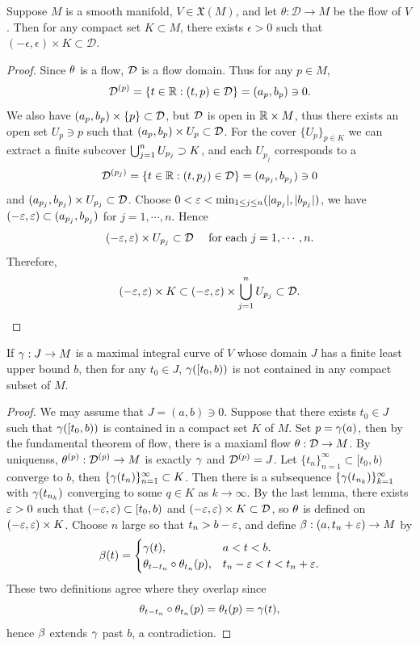 \begin{lemma}
    Suppose $M$ is a smooth manifold, $V \in \mathfrak{X}(M)$, and let $\theta: \mathcal{D} \rightarrow M$ be the flow of $V$. Then for any compact set $K \subset M$, there exists $\epsilon>0$ such that $(-\epsilon, \epsilon) \times K \subset \mathcal{D}$. 
\end{lemma}
\begin{proof}
    Since $\theta$ is a flow, $\mathcal{D}$ is a flow domain. Thus for any $p \in M$, $$\mathcal{D}^{(p)} = \{t \in \mathbb{R}: (t,p) \in \mathcal{D}\} = (a_p, b_p) \ni 0.$$
    We also have $(a_p, b_p) \times \{p\} \subset \mathcal{D}$, but $\mathcal{D}$ is open in $\mathbb{R} \times M$, thus there exists an open set $U_p \ni p$ such that $(a_p, b_p) \times U_p \subset \mathcal{D}$. For the cover $\{U_p\}_{p \in K}$ we can extract a finite subcover $\bigcup_{j=1}^{n}U_{p_j} \supset K$, and each $U_{p_j}$ corresponds to a 
    $$\mathcal{D}^{(p_j)} = \{t \in \mathbb{R}: (t,p_j) \in \mathcal{D} \} = (a_{p_j}, b_{p_j}) \ni 0 $$ and 
    $(a_{p_j}, b_{p_j}) \times U_{p_j} \subset \mathcal{D}$. Choose $0 < \varepsilon < \min_{1\leq j \leq n} (|a_{p_j}|, |b_{p_j}|)$, we have $(-\varepsilon, \varepsilon) \subset (a_{p_j}, b_{p_j})$ for $j=1, \cdots, n$. Hence 
    $$(-\varepsilon, \varepsilon) \times U_{p_j} \subset \mathcal{D} \quad \text{ for each } j=1, \cdots, n. $$
    Therefore, 
    $$(-\varepsilon, \varepsilon) \times K \subset (-\varepsilon, \varepsilon) \times \bigcup_{j=1}^{n}U_{p_j} \subset \mathcal{D}. $$
\end{proof}
\begin{lemma}\label{9.19}
    If $\gamma:J \to M$ is a maximal integral curve of $V$ whose domain $J$ has a finite least upper bound $b$, then for any $t_0 \in J$, $\gamma([t_0,b))$ is not contained in any compact subset of $M$. 
\end{lemma}
\begin{proof}
    We may assume that $J = (a,b) \ni 0$. Suppose that there exists $t_0 \in J$ such that $\gamma([t_0, b))$ is contained in a compact set $K$ of $M$. Set $p = \gamma(a)$, then by the fundamental theorem of flow, there is a maxiaml flow $\theta:\mathcal{D} \to M$. By uniquenss, $\theta^{(p)}:\mathcal{D}^{(p)} \to M$ is exactly $\gamma$ and $\mathcal{D}^{(p)} = J$. Let $\{t_n\}_{n=1}^\infty \subset [t_0, b)$ converge to $b$, then $\{\gamma(t_n)\}_{n=1}^\infty \subset K$. Then there is a subsequence $\{\gamma(t_{n_k})\}_{k=1}^\infty$ with $\gamma(t_{n_k})$ converging to some $q \in K$ as $k \to \infty$. By the last lemma, there exists $\varepsilon>0$ such that $(-\varepsilon, \varepsilon) \subset [t_0, b)$ and 
    $(-\varepsilon, \varepsilon) \times K \subset \mathcal{D}$, so $\theta$ is defined on $(-\varepsilon, \varepsilon) \times K$. Choose $n$ large so that $t_n > b - \varepsilon$, and define $\beta:(a, t_n + \varepsilon) \to M$ by 
    $$\beta(t) = \begin{cases}
        \gamma(t), & a<t<b. \\
        \theta_{t-t_n} \circ \theta_{t_n}(p), & t_n-\varepsilon < t < t_n + \varepsilon.
    \end{cases}$$
    These two definitions agree where they overlap since
    $$\theta_{t-t_n} \circ \theta_{t_n}(p) = \theta_t(p) = \gamma(t), $$
    hence $\beta$ extends $\gamma$ past $b$, a contradiction. 
\end{proof}




